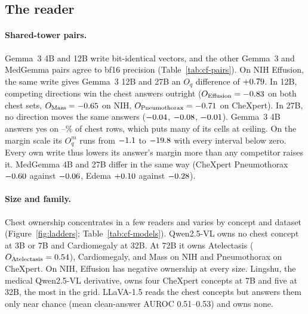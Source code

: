 \subsection{The reader}
\label{app:cf-reader}

\paragraph{Shared-tower pairs.} Gemma~3 4B and 12B write bit-identical vectors, and the other Gemma~3 and MedGemma pairs agree to bf16 precision (Table~\ref{tab:cf-pairs}). On NIH Effusion, the same write gives Gemma~3 12B and 27B an $O_q$ difference of $+0.79$. In 12B, competing directions win the chest answers outright ($O_{\mathrm{Effusion}}=-0.83$ on both chest sets, $O_{\mathrm{Mass}}=-0.65$ on NIH, $O_{\mathrm{Pneumothorax}}=-0.71$ on CheXpert). In 27B, no direction moves the same answers ($-0.04$, $-0.08$, $-0.01$). Gemma~3 4B answers yes on \cfGemmaFourYesMin--\cfGemmaFourYesMax\% of chest rows, which puts many of its cells at ceiling. On the margin scale its $O^m_q$ runs from $-1.1$ to $-19.8$ with every interval below zero. Every own write thus lowers its answer's margin more than any competitor raises it. MedGemma 4B and 27B differ in the same way (CheXpert Pneumothorax $-0.60$ against $-0.06$, Edema $+0.10$ against $-0.28$).



\paragraph{Size and family.} Chest ownership concentrates in a few readers and varies by concept and dataset (Figure~\ref{fig:ladders}; Table~\ref{tab:cf-models}). Qwen2.5-VL owns no chest concept at 3B or 7B and Cardiomegaly at 32B. At 72B it owns Atelectasis ($O_{\mathrm{Atelectasis}}=0.54$), Cardiomegaly, and Mass on NIH and Pneumothorax on CheXpert. On NIH, Effusion has negative ownership at every size. Lingshu, the medical Qwen2.5-VL derivative, owns four CheXpert concepts at 7B and five at 32B, the most in the grid. LLaVA-1.5 reads the chest concepts but answers them only near chance (mean clean-answer AUROC 0.51--0.53) and owns none.

